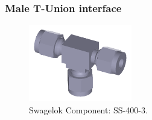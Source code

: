 \subsubsection{Male T-Union interface}


\begin{figure}[H]
    \centering
    \includegraphics[width=0.4\textwidth]{appendix/img/interfaces/SS-400-3-SwagelokCompany-07-10-2018.png}
    \caption{Swagelok Component: SS-400-3.}
    \label{fig:T_interface}
\end{figure}

